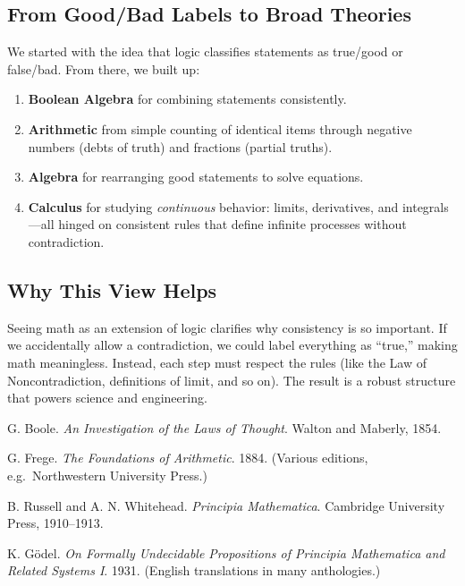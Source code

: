 \documentclass[12pt]{article}
\begin{document}
\subsection{From Good/Bad Labels to Broad Theories}
We started with the idea that logic classifies statements as true/good
or false/bad. From there, we built up:
\begin{enumerate}
  \item \textbf{Boolean Algebra} for combining statements consistently.
  \item \textbf{Arithmetic} from simple counting of identical items
  through negative numbers (debts of truth) and fractions (partial truths).
  \item \textbf{Algebra} for rearranging good statements to solve
  equations.
  \item \textbf{Calculus} for studying \emph{continuous} behavior:
  limits, derivatives, and integrals—all hinged on consistent rules that
  define infinite processes without contradiction.
\end{enumerate}

\subsection{Why This View Helps}
Seeing math as an extension of logic clarifies why consistency is so
important. If we accidentally allow a contradiction, we could label
everything as ``true,'' making math meaningless. Instead, each step must
respect the rules (like the Law of Noncontradiction, definitions of limit,
and so on). The result is a robust structure that powers science and
engineering.

\begin{thebibliography}{9}

G. Boole.
\textit{An Investigation of the Laws of Thought}.
Walton and Maberly, 1854.

G. Frege.
\textit{The Foundations of Arithmetic}.
1884. (Various editions, e.g.\ Northwestern University Press.)

B. Russell and A. N. Whitehead.
\textit{Principia Mathematica}.
Cambridge University Press, 1910--1913.

K. G\"odel.
\textit{On Formally Undecidable Propositions of Principia Mathematica 
and Related Systems I}.
1931. (English translations in many anthologies.)

\end{thebibliography}
\end{document}
